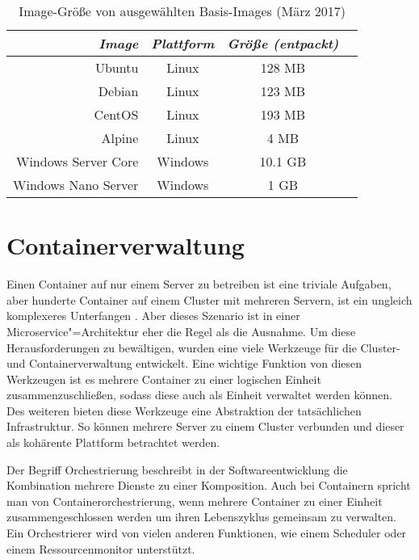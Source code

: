 \begin{table}[!hbt]
\caption{Image-Größe von ausgewählten Basis-Images (März 2017)}
\label{tab:docker-image-size}
\centering
\setlength{\tabcolsep}{5mm} %
\def\arraystretch{1.25} %
\begin{tabular}{|r||c|c|c|}
\hline
\emph{Image} & \emph{Plattform} & \emph{Größe (entpackt)} \\
\hline
\hline
Ubuntu & Linux & 128 MB \\
\hline
Debian & Linux & 123 MB \\
\hline
CentOS & Linux & 193 MB \\
\hline
Alpine & Linux & 4 MB \\
\hline
Windows Server Core & Windows & 10.1 GB \\
\hline
Windows Nano Server & Windows & 1 GB \\
\hline
\end{tabular}
\end{table}

\section{Containerverwaltung}

Einen Container auf nur einem Server zu betreiben ist eine triviale Aufgaben, aber hunderte Container auf einem Cluster mit mehreren Servern, ist ein ungleich komplexeres Unterfangen \cite{RussinovicContainers}. Aber dieses Szenario ist in einer Microservice"=Architektur eher die Regel als die Ausnahme. Um diese Herausforderungen zu bewältigen, wurden eine viele Werkzeuge für die Cluster- und Containerverwaltung entwickelt. Eine wichtige Funktion von diesen Werkzeugen ist es mehrere Container zu einer logischen Einheit zusammenzuschließen, sodass diese auch als Einheit verwaltet werden können. Des weiteren bieten diese Werkzeuge eine Abstraktion der tatsächlichen Infrastruktur. So können mehrere Server zu einem Cluster verbunden und dieser als kohärente Plattform betrachtet werden. 

Der Begriff Orchestrierung beschreibt in der Softwareentwicklung die Kombination mehrere Dienste zu einer Komposition. Auch bei Containern spricht man von Containerorchestrierung, wenn mehrere Container zu einer Einheit zusammengeschlossen werden um ihren Lebenszyklus gemeinsam zu verwalten. Ein Orchestrierer wird von vielen anderen Funktionen, wie \zB einem Scheduler oder einem Ressourcenmonitor unterstützt. 

